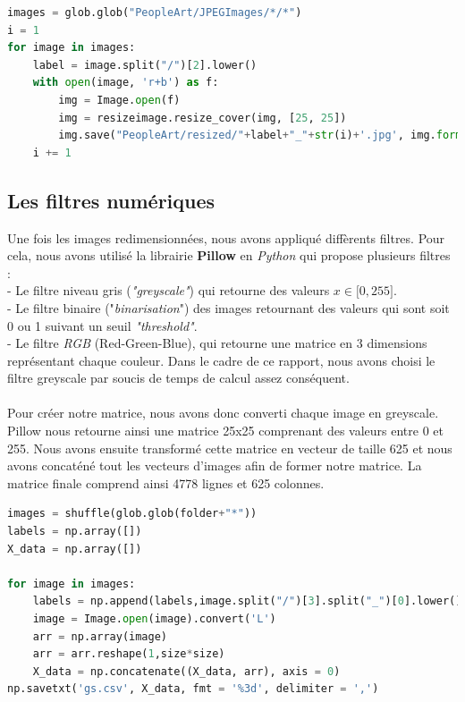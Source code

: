 \documentclass[runningheads]{llncs}
\begin{document}
\begin{lstlisting}[language=Python]
images = glob.glob("PeopleArt/JPEGImages/*/*")
i = 1
for image in images:
    label = image.split("/")[2].lower()
    with open(image, 'r+b') as f:
        img = Image.open(f)
        img = resizeimage.resize_cover(img, [25, 25])
        img.save("PeopleArt/resized/"+label+"_"+str(i)+'.jpg', img.format)
    i += 1

\end{lstlisting}

\subsection{Les filtres num\'eriques}
\label{filtre}

Une fois les images redimensionnées, nous avons appliqué diffèrents filtres.
Pour cela, nous avons utilisé la librairie \textbf{Pillow} en \textit{Python} qui propose plusieurs filtres : \\ - Le filtre niveau gris (\textit{"greyscale"}) qui retourne des valeurs $x \in \mathopen[0,255\mathclose]$. \\ - Le filtre binaire ("\textit{binarisation}") des images  retournant des valeurs qui sont soit 0 ou 1 suivant un seuil \textit{"threshold"}. \\ - Le filtre \textit{RGB} (Red-Green-Blue), qui retourne une matrice en 3 dimensions représentant chaque couleur.
Dans le cadre de ce rapport, nous avons choisi le filtre greyscale par soucis de temps de calcul assez conséquent.\\ \\
Pour créer notre matrice, nous avons donc converti chaque image en greyscale. Pillow nous retourne ainsi une matrice 25x25 comprenant des valeurs entre 0 et 255. Nous avons ensuite transformé cette matrice en vecteur de taille 625 et nous avons concaténé tout les vecteurs d'images afin de former notre matrice. La matrice finale comprend ainsi 4778 lignes et 625 colonnes. 

\begin{lstlisting}[language=Python]
images = shuffle(glob.glob(folder+"*"))
labels = np.array([])
X_data = np.array([])

for image in images:    
    labels = np.append(labels,image.split("/")[3].split("_")[0].lower())    
    image = Image.open(image).convert('L')
    arr = np.array(image)
    arr = arr.reshape(1,size*size)    
    X_data = np.concatenate((X_data, arr), axis = 0)
np.savetxt('gs.csv', X_data, fmt = '%3d', delimiter = ',')
\end{lstlisting}
\end{document}
